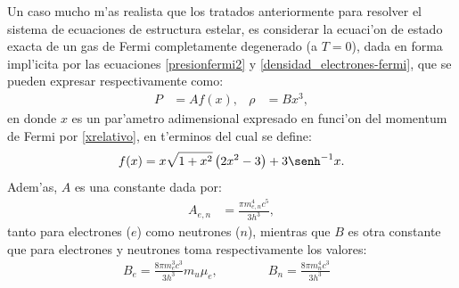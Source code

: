 Un caso mucho m'as realista que los tratados anteriormente para resolver el sistema de ecuaciones de estructura estelar, es considerar la ecuaci'on de estado exacta de un gas de Fermi completamente degenerado (a $T=0$), dada en forma impl'icita por las ecuaciones \eqref{presionfermi2} y \eqref{densidad_electrones-fermi}, que se pueden expresar respectivamente como:
\begin{align}\label{ec-estado-fermi}
 P&=Af(x),&\rho&=Bx^3,
\end{align}
en donde $x$ es un par'ametro adimensional expresado en funci'on del momentum de Fermi por \eqref{xrelativo}, en t'erminos del cual se define:
\begin{equation}\label{ec-fermi-fx}
 f(x)=x\sqrt{1+x^2}\left(2x^2-3\right)+3\senh^{-1}x.
\end{equation}
Adem'as, $A$ es una constante dada por:
\begin{align}\label{ec-fermi-A}
 A_{e,n}&=\frac{\pi m_{e,n}^4 c^5}{3 h^3},
\end{align}
tanto para electrones ($e$) como neutrones ($n$), mientras que $B$ es otra constante que para electrones y neutrones toma respectivamente los valores:
\begin{align}\label{ec-fermi-B}
B_e=\frac{8\pi m_e^3 c^3}{3h^3}m_u\mu_e,\qquad\qquad B_n=\frac{8\pi m_n^4 c^3}{3h^3}&
\end{align}

